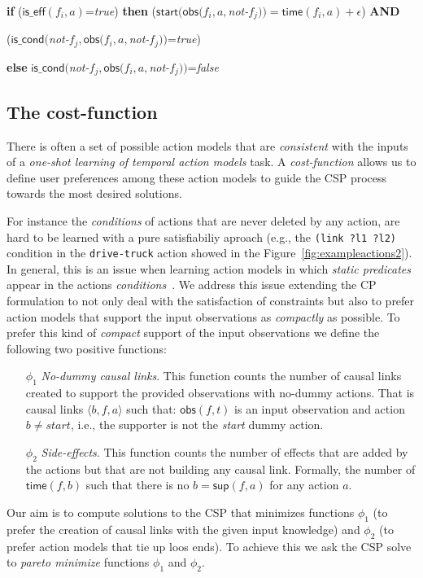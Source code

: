 \documentclass{ecai}
\newcommand{\tup}[1]{{\langle #1 \rangle}}
\newcommand{\iscond}{\mathsf{is\_cond}}    %
\newcommand{\iseff}{\mathsf{is\_eff}}    %
\newcommand{\obs}{\mathsf{obs}}    %
\newcommand{\start}{\mathsf{start}}%
\newcommand{\supp}{\mathsf{sup}}   %
\newcommand{\tim}{\mathsf{time}}   %
\begin{document}
{\scriptsize 
\textbf{if} ($\iseff(f_i,a)$=\textit{true}) \textbf{then} ($\start(\obs(f_i,a,$\textit{not-}$f_j))=\tim(f_i,a)+\epsilon$) \textbf{AND}

\hspace{2.83cm}($\iscond($\textit{not-}$f_j,\obs(f_i,a,$\textit{not-}$f_j))$=\textit{true})

\textbf{else} $\iscond($\textit{not-}$f_j,\obs(f_i,a,$\textit{not-}$f_j))$=\textit{false}
}

\subsection{The cost-function}
There is often a set of possible action models that are {\em consistent} with the inputs of a {\em one-shot learning of temporal action models} task. A {\em cost-function} allows us to define user preferences among these action models to guide the CSP process towards the most desired solutions.

For instance the {\em conditions} of actions that are never deleted by any action, are hard to be learned with a pure satisfiabiliy aproach (e.g., the {\tt (link ?l1 ?l2)} condition in the {\tt drive-truck} action showed in the Figure~\ref{fig:exampleactions2}). In general, this is an issue when learning action models in which {\em static predicates} appear in the actions {\em conditions}~\cite{gregory2015domain}. We address this issue extending the CP formulation to not only deal with the satisfaction of constraints but also to prefer action models that support the input observations as {\em compactly} as possible. To prefer this kind of {\em compact} support of the input observations we define the following two positive functions:
\begin{enumerate}
\item[$\phi_1$] {\em No-dummy causal links}. This function counts the number of causal links created to support the provided observations with no-dummy actions. That is causal links $\tup{b,f,a}$ such that: $\obs(f,t)$ is an input observation and action $b\neq start$, i.e., the supporter is not the {\em start} dummy action.
\item[$\phi_2$] {\em Side-effects}. This function counts the number of effects that are added by the actions but that are not building any causal link. Formally, the number of $\tim(f,b)$ such that there is no $b=\supp(f,a)$ for any action $a$. 
\end{enumerate}

Our aim is to compute solutions to the CSP that minimizes functions $\phi_1$ (to prefer the creation of causal links with the given input knowledge) and $\phi_2$ (to prefer action models that tie up loos ends). To achieve this we ask the CSP solve to {\em pareto minimize} functions $\phi_1$ and $\phi_2$. 
  
\end{document}
